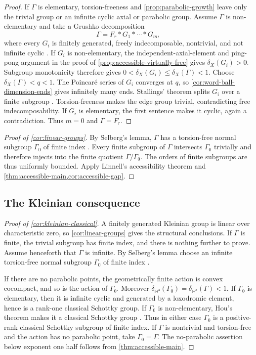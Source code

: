 \documentclass[11pt]{article}
\theoremstyle{definition}
\begin{document}
\begin{proof}
If $\Gamma$ is elementary, torsion-freeness and \cref{prop:parabolic-growth} leave only the
trivial group or an infinite cyclic axial or parabolic group.  Assume $\Gamma$ is
non-elementary and take a Grushko decomposition
\[
 \Gamma=F_r*G_1*\cdots*G_m,
\]
where every $G_i$ is finitely generated, freely indecomposable, nontrivial, and not infinite
cyclic \cite[Chapter~I.4]{LyndonSchupp1977}.  If $G_i$ is non-elementary, the independent-axial-element
and ping-pong argument in the proof of \cref{prop:accessible-virtually-free} gives
$\delta_X(G_i)>0$.  Subgroup monotonicity therefore gives
$0<\delta_X(G_i)\le\delta_X(\Gamma)<1$.  Choose $\delta_X(\Gamma)<q<1$.  The Poincar\'e
series of $G_i$ converges at $q$, so \cref{cor:word-ball-dimension-ends} gives infinitely many ends.
Stallings' theorem splits
$G_i$ over a finite subgroup \cite{Stallings1968}. Torsion-freeness makes the edge group
trivial, contradicting free indecomposability.  If $G_i$ is elementary, the first sentence
makes it cyclic, again a contradiction.  Thus $m=0$ and $\Gamma=F_r$.
\end{proof}

\begin{proof}[Proof of \cref{cor:linear-groups}]
By Selberg's lemma, $\Gamma$ has a torsion-free normal subgroup $\Gamma_0$ of finite index
\cite{Selberg1960}.  Every finite subgroup of $\Gamma$ intersects $\Gamma_0$ trivially and
therefore injects into the finite quotient $\Gamma/\Gamma_0$.  The orders of finite subgroups
are thus uniformly bounded.  Apply Linnell's accessibility theorem and
\cref{thm:accessible-main,cor:accessible-gap}.
\end{proof}

\subsection{The Kleinian consequence}

\begin{proof}[Proof of \cref{cor:kleinian-classical}]
A finitely generated Kleinian group is linear over characteristic zero, so
\cref{cor:linear-groups} gives the structural conclusions.  If $\Gamma$ is finite, the trivial subgroup
has finite index, and there is nothing further to prove.  Assume henceforth that $\Gamma$ is infinite.
By Selberg's lemma choose an infinite torsion-free normal subgroup $\Gamma_0$ of finite index
\cite{Selberg1960}.

If there are no parabolic points, the geometrically finite action is convex cocompact, and so is the
action of $\Gamma_0$.  Moreover
$\delta_{\mathbb H^3}(\Gamma_0)=\delta_{\mathbb H^3}(\Gamma)<1$.  If $\Gamma_0$ is elementary, then it is
infinite cyclic and generated by a loxodromic element, hence is a rank-one classical Schottky group.
If $\Gamma_0$ is non-elementary, Hou's theorem makes it a classical Schottky group
\cite[Theorem~1.1]{Hou2023}.  Thus in either case $\Gamma_0$ is a positive-rank classical Schottky
subgroup of finite index.  If $\Gamma$ is nontrivial and torsion-free and the action has no parabolic
point, take $\Gamma_0=\Gamma$.  The no-parabolic assertion below exponent one half follows from
\cref{thm:accessible-main}.
\end{proof}
\end{document}
